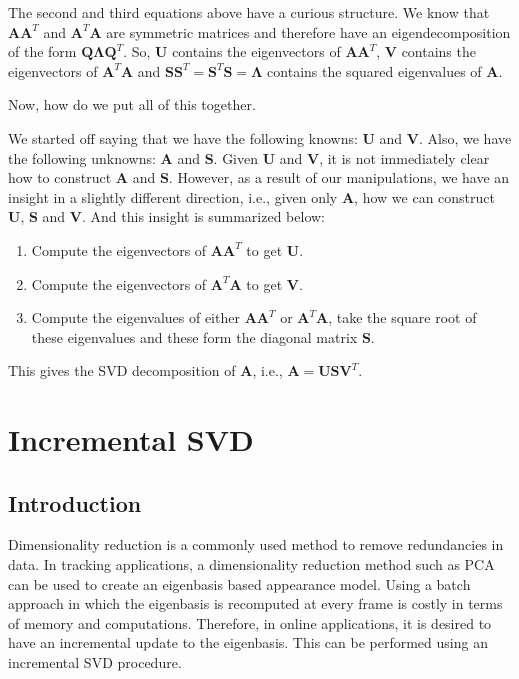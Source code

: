 The second and third equations above have a curious structure.  We know that $\mathbf{A}\mathbf{A}^T$ and $\mathbf{A}^T\mathbf{A}$ are symmetric matrices and therefore have an eigendecomposition of the form $\mathbf{Q}\mathbf{\Lambda}\mathbf{Q}^T$.  So, $\mathbf{U}$ contains the eigenvectors of $\mathbf{A}\mathbf{A}^T$, $\mathbf{V}$ contains the eigenvectors of $\mathbf{A}^T\mathbf{A}$ and $\mathbf{S} \mathbf{S}^T = \mathbf{S}^T \mathbf{S} = \boldsymbol\Lambda$ contains the squared eigenvalues of  $\mathbf{A}$.

Now, how do we put all of this together.

We started off saying that we have the following knowns: $\mathbf{U}$ and $\mathbf{V}$.  Also, we have the following unknowns: $\mathbf{A}$ and $\mathbf{S}$.  Given $\mathbf{U}$ and $\mathbf{V}$, it is not immediately clear how to construct $\mathbf{A}$ and $\mathbf{S}$.  However, as a result of our manipulations, we have an insight in a slightly different direction, i.e., given only $\mathbf{A}$, how we can construct $\mathbf{U}$, $\mathbf{S}$ and $\mathbf{V}$.  And this insight is summarized below:

\begin{enumerate}
\item  Compute the eigenvectors of $\mathbf{A}\mathbf{A}^T$ to get $\mathbf{U}$.
\item  Compute the eigenvectors of $\mathbf{A}^T\mathbf{A}$ to get $\mathbf{V}$.
\item  Compute the eigenvalues of either $\mathbf{A}\mathbf{A}^T$ or $\mathbf{A}^T\mathbf{A}$, take the square root of these eigenvalues and these form the diagonal matrix $\mathbf{S}$.
\end{enumerate}

This gives the SVD decomposition of $\mathbf{A}$, i.e., $\mathbf{A} =\mathbf{U} \mathbf{S} \mathbf{V}^T$.

\section{Incremental SVD}

\subsection{Introduction}
Dimensionality reduction is a commonly used method to remove redundancies in data.  In tracking applications, a dimensionality reduction method such as PCA can be used to create an eigenbasis based appearance model.  Using a batch approach in which the eigenbasis is recomputed at every frame is costly in terms of memory and computations.  Therefore, in online applications, it is desired to have an incremental update to the eigenbasis.  This can be performed using an incremental SVD procedure.

